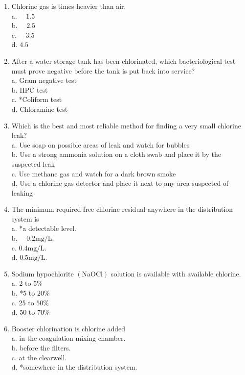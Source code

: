 \documentclass[10pt]{article}
\begin{document}
\begin{enumerate}
  \item Chlorine gas is times heavier than air.\\
a. $\quad 1.5$\\
b. $\quad 2.5$\\
c. $\quad 3.5$\\
d. $4.5$ 

	\item After a water storage tank has been chlorinated, which bacteriological test must prove negative before the tank is put back into service?\\
a. Gram negative test\\
b. HPC test\\
c. *Coliform test\\
d. Chloramine test

  \item Which is the best and most reliable method for finding a very small chlorine leak?\\
a. Use soap on possible areas of leak and watch for bubbles\\
b. Use a strong ammonia solution on a cloth swab and place it by the suspected leak\\
c. Use methane gas and watch for a dark brown smoke\\
d. Use a chlorine gas detector and place it next to any area suspected of leaking

  \item The minimum required free chlorine residual anywhere in the distribution system is\\
a. *a detectable level.\\
b. $\quad 0.2 \mathrm{mg} / \mathrm{L}$.\\
c. $0.4 \mathrm{mg} / \mathrm{L}$.\\
d. $0.5 \mathrm{mg} / \mathrm{L}$.

  \item Sodium hypochlorite $(\mathrm{NaOCl})$ solution is available with available chlorine.\\
a. 2 to $5 \%$\\
b. *5 to $20 \%$\\
c. 25 to $50 \%$\\
d. 50 to $70 \%$

  \item Booster chlorination is chlorine added\\
a. in the coagulation mixing chamber.\\
b. before the filters.\\
c. at the clearwell.\\
d. *somewhere in the distribution system.


\end{enumerate}
\end{document}
